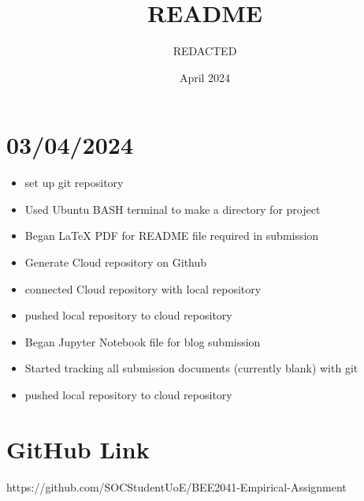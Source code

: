 \documentclass{article}
\title{README}
\author{REDACTED}
\date{April 2024}
\begin{document}
\maketitle

\section*{03/04/2024}
\begin{itemize}
    \item set up git repository
    \item Used Ubuntu BASH terminal to make a directory for project
    \item Began LaTeX PDF for README file required in submission
    \item Generate Cloud repository on Github 
    \item connected Cloud repository with local repository
    \item pushed local repository to cloud repository
    \item Began Jupyter Notebook file for blog submission
    \item Started tracking all submission documents (currently blank) with git
    \item pushed local repository to cloud repository
\end{itemize}

\section*{GitHub Link}
https://github.com/SOCStudentUoE/BEE2041-Empirical-Assignment
\end{document}
